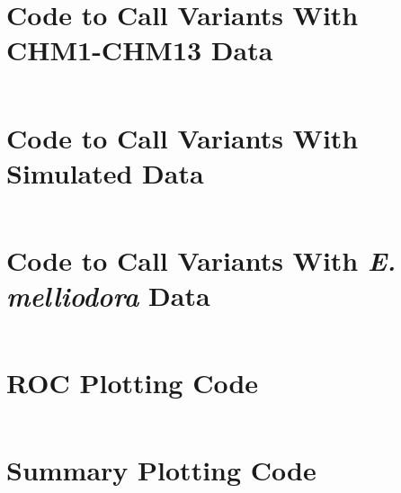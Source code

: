 \section{Code to Call Variants With CHM1-CHM13 Data}
\inputminted[breaklines, breakanywhere, tabsize=2]{Makefile}{ch5/scripts/chm1-chm13_variants_makefiles.txt}
\section{Code to Call Variants With Simulated Data}
\inputminted[breaklines, breakanywhere, tabsize=2]{Makefile}{ch5/scripts/sim_variants_makefiles.txt}
\section{Code to Call Variants With \textit{E. melliodora} Data}
\inputminted[breaklines, breakanywhere, tabsize=2]{Makefile}{ch5/scripts/euc_variants_makefiles.txt}
\section{ROC Plotting Code}
\inputminted[breaklines, breakanywhere, tabsize=2]{r}{ch5/scripts/roc_plots.R}
\section{Summary Plotting Code}
\inputminted[breaklines, breakanywhere, tabsize=2]{r}{ch5/scripts/hapdip_summary_plots.R}

